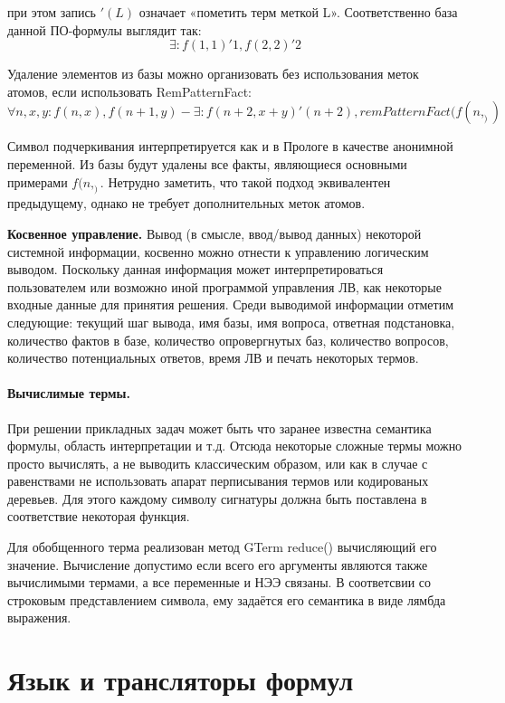 при этом запись $'(L)$ означает «пометить терм меткой L». Соответственно база данной ПО-формулы выглядит так:
\begin{equation}
\exists\colon f(1,1)'1, f(2,2)'2  
\end{equation}

Удаление элементов из базы можно организовать без использования меток атомов, если использовать RemPatternFact:
\begin{equation}
	\forall n,x,y\colon f(n,x),f(n+1,y) - \exists\colon f(n+2,x+y)'(n+2), remPatternFact(f(n,_))
\end{equation}

Символ подчеркивания интерпретируется как и в Прологе в качестве анонимной переменной. Из базы будут удалены все факты, являющиеся основными примерами  $f(n,_)$. Нетрудно заметить, что такой подход эквивалентен предыдущему, однако не требует дополнительных меток атомов.

\textbf{Косвенное управление.} Вывод (в смысле, ввод/вывод данных) некоторой системной информации, косвенно можно отнести к управлению логическим выводом. Поскольку данная информация может интерпретироваться пользователем или возможно иной программой управления ЛВ, как некоторые входные данные для принятия решения. Среди выводимой информации отметим следующие: текущий шаг вывода, имя базы, имя вопроса, ответная подстановка, количество фактов в базе, количество опровергнутых баз, количество вопросов, количество потенциальных ответов, время ЛВ и печать некоторых термов.

\paragraph{Вычислимые термы.} При решении прикладных задач может быть что заранее известна семантика формулы, область интерпретации и т.д. Отсюда некоторые сложные термы можно просто вычислять, а не выводить классическим образом, или как в случае с равенствами не использовать апарат перписывания термов или кодированых деревьев. Для этого каждому символу сигнатуры должна быть поставлена в соответствие некоторая функция.

Для обобщенного терма реализован метод GTerm reduce() вычисляющий его значение. Вычисление допустимо если всего его аргументы являются также вычислимыми термами, а все переменные и НЭЭ связаны. В соответсвии со строковым представлением символа, ему задаётся его семантика в виде лямбда выражения.


\section{Язык и трансляторы формул} 


